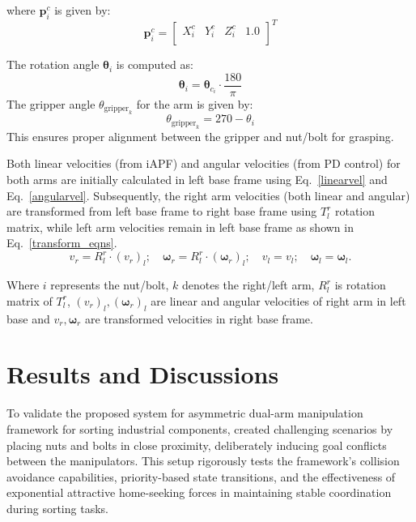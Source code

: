 \documentclass[utf8]{FrontiersinHarvard}
\begin{document}
where \( \mathbf{p}^{c}_{i} \) is given by:
\[
\mathbf{p}^{c}_{i} =
\begin{bmatrix}
X^{c}_{i} & Y^{c}_{i} & Z^{c}_{i} & 1.0\\
\end{bmatrix}
^{T}
\]

The rotation angle \( \mathbf{\theta}_{i} \) is computed as:
\[
    \mathbf{\theta}_{i} = \mathbf{\theta}_{c_{i}} \cdot \frac{180}{\pi}\]
The gripper angle \( \theta_{\text{gripper}_{k}} \) for the arm is given by:
\begin{equation}
    \theta_{\text{gripper}_{k}} = 270 - \theta_{i}    
\end{equation}
This ensures proper alignment between the gripper and nut/bolt for grasping.

\noindent Both linear velocities (from iAPF) and angular velocities (from PD control) for both arms are initially calculated in left base frame using Eq.~\ref{linearvel} and Eq.~\ref{angularvel}. Subsequently, the right arm velocities (both linear and angular) are transformed from left base frame to right base frame using $T^{r}_{l}$ rotation matrix, while left arm velocities remain in left base frame as shown in Eq.~\ref{transform_eqns}. 
\begin{equation}
    v_{r} = R^{r}_{l}\cdot (v_{r})_{l}; \quad
    \mathbf{\omega}_{r} = R^{r}_{l}\cdot (\mathbf{\omega}_{r})_{l}; \quad
    v_{l} = v_{l}; \quad
    \mathbf{\omega}_{l} = \mathbf{\omega}_{l}.
    \label{transform_eqns}
\end{equation}
    
\noindent Where \( i \) represents the nut/bolt, \( k \) denotes the right/left arm, \(R^{r}_{l} \) is rotation matrix of \(T^{r}_{l}\), \((v_{r})_{l}, (\mathbf{\omega}_{r})_{l}\) are linear and angular velocities of right arm in left base and \(v_{r}, \mathbf{\omega}_{r}\) are transformed velocities in right base frame.
\section{Results and Discussions}
\label{results}
To validate the proposed system for asymmetric dual-arm manipulation framework for sorting industrial components, created challenging scenarios by placing nuts and bolts in close proximity, deliberately inducing goal conflicts between the manipulators. This setup rigorously tests the framework's collision avoidance capabilities, priority-based state transitions, and the effectiveness of exponential attractive home-seeking forces in maintaining stable coordination during sorting tasks.
\end{document}
